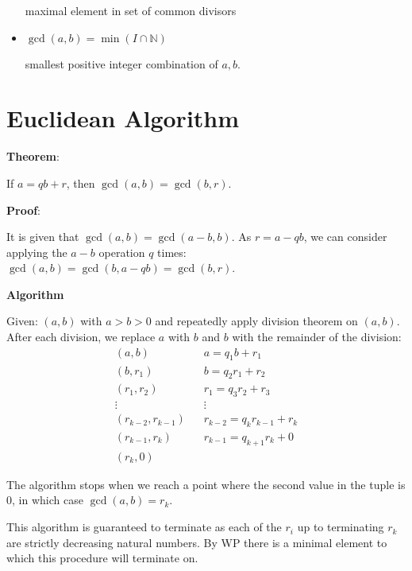 \documentclass{article}
\begin{document}
\begin{multicols*}{2}
\begin{itemize}
    maximal element in set of common divisors
    \item $\gcd(a, b) = \min(I \cap \mathbb{N})$
    
    smallest positive integer combination of $a, b$.
    
\end{itemize}

\section{Euclidean Algorithm}

\textbf{Theorem}:

If $a = qb + r$, then $\gcd(a, b) = \gcd(b, r)$.

\textbf{Proof}:

It is given that $\gcd(a, b) = \gcd(a - b, b)$. As $r = a - qb$, we can consider applying the $a - b$ operation $q$ times: $\gcd(a, b) = \gcd(b, a - qb) = \gcd(b, r)$.

\textbf{Algorithm}

Given: $(a, b)$ with $a > b > 0$ and repeatedly apply division theorem on $(a, b)$. After each division, we replace $a$ with $b$ and $b$ with the remainder of the division:\[\begin{aligned}
    (a, b) \;\;\;& a  = q_1b + r_1 \\
    (b, r_1) \;\;\;& b  = q_2r_1 + r_2 \\
    (r_1, r_2) \;\;\;& r_1  = q_3r_2 + r_3 \\
    \vdots \;\;\;& \vdots \\
    (r_{k-2},r_{k-1}) \;\;\;& r_{k-2} = q_kr_{k-1}+ r_k \\
    (r_{k-1}, r_k) \;\;\;& r_{k-1} = q_{k+1}r_{k}+ 0 \\
    (r_k, 0) \;\;\;& 
\end{aligned}\]

The algorithm stops when we reach a point where the second value in the tuple is $0$, in which case $\gcd(a, b) = r_k$.

This algorithm is guaranteed to terminate as each of the $r_i$ up to terminating $r_k$ are strictly decreasing natural numbers. By WP there is a minimal element to which this procedure will terminate on.



\end{multicols*}
\end{document}
